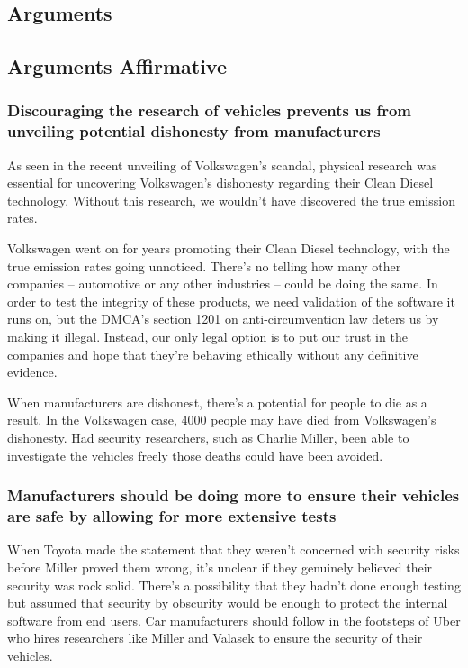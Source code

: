 \documentclass[12pt]{article}
\begin{document}
\begin{multicols}{2}
\section{Arguments}

\subsection{Arguments Affirmative}

\subsubsection{Discouraging the research of vehicles prevents us from unveiling potential dishonesty from manufacturers}

As seen in the recent unveiling of Volkswagen's scandal, physical research was essential for uncovering Volkswagen's dishonesty regarding their Clean Diesel technology. \cite{vwScandal} Without this research, we wouldn't have discovered the true emission rates.

Volkswagen went on for years promoting their Clean Diesel technology, with the true emission rates going unnoticed. There's no telling how many other companies -- automotive or any other industries -- could be doing the same. In order to test the integrity of these products, we need validation of the software it runs on, but the DMCA's section 1201 on anti-circumvention law deters us by making it illegal. Instead, our only legal option is to put our trust in the companies and hope  that they're behaving ethically without any definitive evidence. \cite{brokeDMCA} 

When manufacturers are dishonest, there's a potential for people to die as a result. In the Volkswagen case, 4000 people may have died from Volkswagen's dishonesty.\cite{vwkills} Had security researchers, such as Charlie Miller, been able to investigate the vehicles freely those deaths could have been avoided.



\subsubsection{Manufacturers should be doing more to ensure their vehicles are safe by allowing for more extensive tests}

When Toyota made the statement that they weren't concerned with security risks \cite{originalHack} before Miller proved them wrong, it's unclear if they genuinely believed their security was rock solid. There's a possibility that they hadn't done enough testing but assumed that security by obscurity would be enough to protect the internal software from end users\cite{brokeDMCA}. Car manufacturers should follow in the footsteps of Uber who hires researchers like Miller and Valasek to ensure the security of their vehicles\cite{uber}.



\end{multicols}
\end{document}

